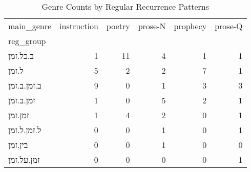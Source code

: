 \begin{table}[htbp!]
\centering
\caption{Genre Counts by Regular Recurrence Patterns}
\label{table:regroup_gen_ct}
\begin{tabular}{lrrrrr}
\toprule
main\_genre &  instruction &  poetry &  prose-N &  prophecy &  prose-Q \\
reg\_group   &              &         &          &           &          \\
\midrule
ב.כל.זמן    &            1 &      11 &        4 &         1 &        1 \\
ל.זמן       &            5 &       2 &        2 &         7 &        1 \\
ב.זמן.ב.זמן &            9 &       0 &        1 &         3 &        3 \\
זמן.ב.זמן   &            1 &       0 &        5 &         2 &        1 \\
זמן.זמן     &            1 &       4 &        2 &         0 &        1 \\
ל.זמן.ל.זמן &            0 &       0 &        1 &         0 &        1 \\
בין.זמן     &            0 &       0 &        1 &         0 &        0 \\
זמן.על.זמן  &            0 &       0 &        0 &         0 &        1 \\
\bottomrule
\end{tabular}
\end{table}
